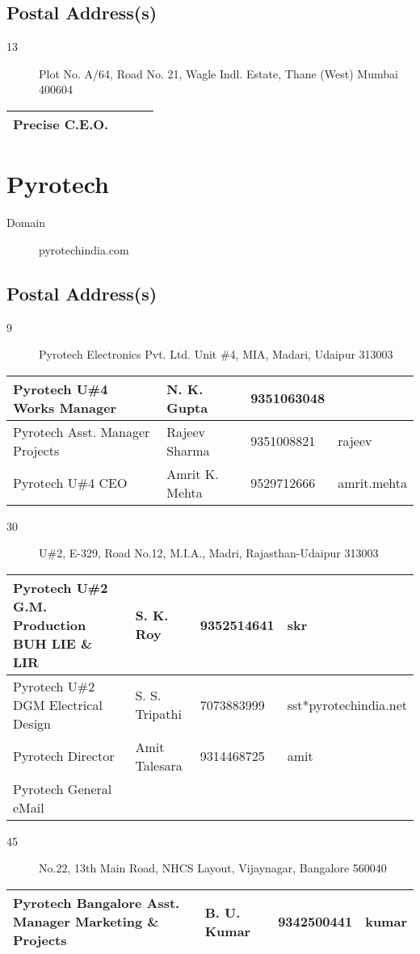 \documentclass[a4paper, 11pt, twoside]{book}
\begin{document}
\subsection*{Postal Address(s)}
\begin{description}
\item [13]Plot No. A/64, Road No. 21, Wagle Indl. Estate, Thane (West) Mumbai 400604
\end{description}
\begin{tabular}{|p{4cm}|p{2cm}|p{2cm}|p{3cm}|}
\hline
Precise C.E.O. & & &  \\ \hline
\end{tabular}
\section{Pyrotech}\label{com:2}
\begin{description}
\item[Domain]pyrotechindia.com
\end{description}
\subsection*{Postal Address(s)}
\begin{description}
\item [9]Pyrotech Electronics Pvt. Ltd. Unit \#4, MIA, Madari, Udaipur 313003
\end{description}
\begin{tabular}{|p{4cm}|p{2cm}|p{2cm}|p{3cm}|}
\hline
Pyrotech U\#4 Works Manager & N. K. Gupta & 9351063048 &  \\ \hline
Pyrotech Asst. Manager Projects & Rajeev Sharma & 9351008821 & rajeev \\ \hline
Pyrotech U\#4 CEO & Amrit K. Mehta & 9529712666 & amrit.mehta \\ \hline
\end{tabular}
\begin{description}
\item [30]U\#2, E-329, Road No.12, M.I.A., Madri, Rajasthan-Udaipur 313003
\end{description}
\begin{tabular}{|p{4cm}|p{2cm}|p{2cm}|p{3cm}|}
\hline
Pyrotech U\#2 G.M. Production BUH LIE \& LIR & S. K. Roy & 9352514641 & skr \\ \hline
Pyrotech U\#2 DGM Electrical Design & S. S. Tripathi & 7073883999 & sst*pyrotechindia.net \\ \hline
Pyrotech Director & Amit Talesara & 9314468725 & amit \\ \hline
Pyrotech General eMail & & &  \\ \hline
\end{tabular}
\begin{description}
\item [45]No.22, 13th Main Road, NHCS Layout, Vijaynagar, Bangalore 560040
\end{description}
\begin{tabular}{|p{4cm}|p{2cm}|p{2cm}|p{3cm}|}
\hline
Pyrotech Bangalore Asst. Manager Marketing \& Projects & B. U. Kumar & 9342500441 & kumar \\ \hline
\end{tabular}
\end{document}
